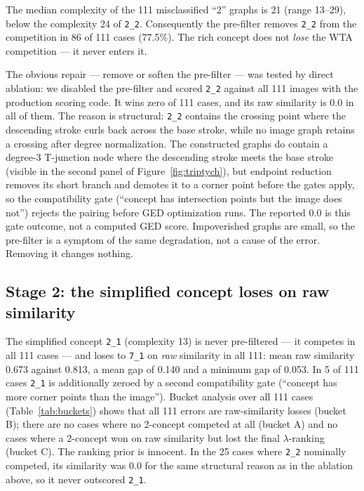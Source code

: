 \documentclass[conference]{IEEEtran}
\newcommand{\cid}[1]{\texttt{#1}}   %
\begin{document}
The median complexity of the 111 misclassified ``2'' graphs is 21
(range 13--29), below the complexity 24 of \cid{2\_2}. Consequently the
pre-filter removes \cid{2\_2} from the competition in 86 of 111
cases (77.5\%). The rich concept does not \emph{lose} the WTA
competition --- it never enters it.

The obvious repair --- remove or soften the pre-filter --- was tested by
direct ablation: we disabled the pre-filter and scored \cid{2\_2} against
all 111 images with the production scoring code. It wins zero of
111 cases, and its raw similarity is $0.0$ in all of them. The reason is
structural: \cid{2\_2} contains the crossing point where
the descending stroke curls back across the base stroke, while no image
graph retains a crossing after degree normalization. The constructed
graphs do contain a degree-3 T-junction node where the descending stroke
meets the base stroke (visible in the second panel of
Figure~\ref{fig:triptych}), but endpoint reduction removes its short
branch and demotes it to a corner point before the gates apply, so the
compatibility gate (``concept
has intersection points but the image does not'') rejects the pairing
before GED optimization runs. The reported $0.0$ is this gate outcome, not
a computed GED score. Impoverished graphs are small, so the
pre-filter is a symptom of the same degradation, not a cause of the
error. Removing it changes nothing.

\subsection{Stage 2: the simplified concept loses on raw similarity}

The simplified concept \cid{2\_1} (complexity 13) is never pre-filtered
--- it competes in all 111 cases --- and loses to \cid{7\_1} on \emph{raw}
similarity in all 111: mean raw similarity 0.673 against 0.813, a mean gap
of 0.140 and a minimum gap of 0.053. In 5 of 111 cases \cid{2\_1} is
additionally zeroed by a second compatibility gate (``concept has more
corner points than the image''). Bucket analysis over all 111 cases
(Table~\ref{tab:buckets}) shows that all 111 errors are
raw-similarity losses (bucket B); there are no cases where no 2-concept
competed at all (bucket A) and no cases where a
2-concept won on raw similarity but lost the final $\lambda$-ranking
(bucket C). The ranking prior is innocent. In the 25 cases where
\cid{2\_2} nominally competed, its similarity was $0.0$ for the same
structural reason as in the ablation above, so it never outscored
\cid{2\_1}.
\end{document}
